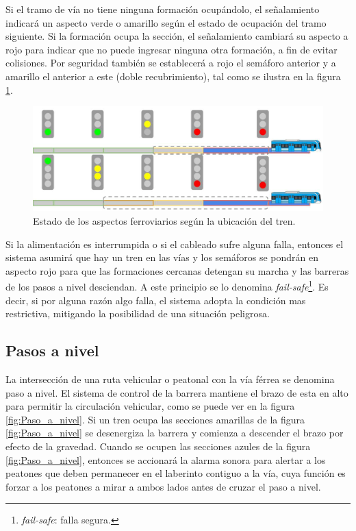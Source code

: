 			
			Si el tramo de vía no tiene ninguna formación ocupándolo, el señalamiento indicará un aspecto verde o amarillo según el estado de ocupación del tramo siguiente. Si la formación ocupa la sección, el señalamiento cambiará su aspecto a rojo para indicar que no puede ingresar ninguna otra formación, a fin de evitar colisiones. Por seguridad también se establecerá a rojo el semáforo anterior y a amarillo el anterior a este (doble recubrimiento), tal como se ilustra en la figura \ref{fig:Recubrimiento}.			
					
			\begin{figure}[h]
				\centering
				\includegraphics[scale=.4]{./Figures/Recubrimiento}
				\caption{Estado de los aspectos ferroviarios según la ubicación del tren.}
				\label{fig:Recubrimiento}
			\end{figure}			
			
			Si la alimentación es interrumpida o si el cableado sufre alguna falla, entonces el sistema asumirá que hay un tren en las vías y los semáforos se pondrán en aspecto rojo para que las formaciones cercanas detengan su marcha y las barreras de los pasos a nivel desciendan. A este principio se lo denomina \textit{fail-safe}\footnote{\textit{fail-safe}: falla segura.}. Es decir, si por alguna razón algo falla, el sistema adopta la condición mas restrictiva, mitigando la posibilidad de una situación peligrosa. 		
			
		\subsection{Pasos a nivel}
		
			La intersección de una ruta vehicular o peatonal con la vía férrea se denomina paso a nivel. El sistema de control de la barrera mantiene el brazo de esta en alto para permitir la circulación vehicular, como se puede ver en la figura \ref{fig:Paso_a_nivel}. Si un tren ocupa las secciones amarillas de la figura \ref{fig:Paso_a_nivel} se desenergiza la barrera y comienza a descender el brazo por efecto de la gravedad. Cuando se ocupen las secciones azules de la figura \ref{fig:Paso_a_nivel}, entonces se accionará la alarma sonora para alertar a los peatones que deben permanecer en el laberinto contiguo a la vía, cuya función es forzar a los peatones a mirar a ambos lados antes de cruzar el paso a nivel.			
			
